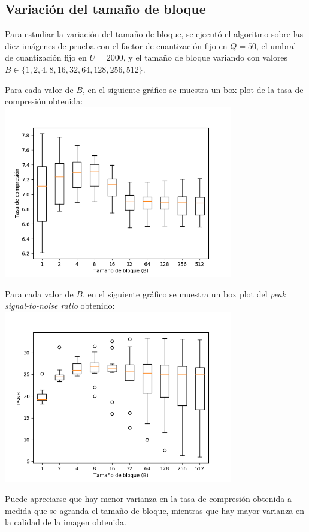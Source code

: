 \documentclass{article}
\newcommand{\set}[1]{\{#1\}}
\begin{document}
\newpage
\subsection{Variación del tamaño de bloque}

Para estudiar la variación del tamaño de bloque, se ejecutó el
algoritmo sobre las diez imágenes de prueba con el
factor de cuantización fijo en $Q = 50$,
el umbral de cuantización fijo en $U = 2000$,
y el tamaño de bloque variando con valores
$B \in \set{1,2,4,8,16,32,64,128,256,512}$.

Para cada valor de $B$, en el siguiente gráfico se muestra un
box plot de la tasa de compresión obtenida:\\
\includegraphics[width=10cm]{../imgs/output/gray_plots/b_rate.png}

Para cada valor de $B$, en el siguiente gráfico se muestra un
box plot del {\em peak signal-to-noise ratio} obtenido:\\
\includegraphics[width=10cm]{../imgs/output/gray_plots/b_psnr.png}

Puede apreciarse que hay menor varianza en la tasa de compresión
obtenida a medida que se agranda el tamaño de bloque,
mientras que hay mayor varianza en la calidad de la imagen obtenida.
\end{document}
